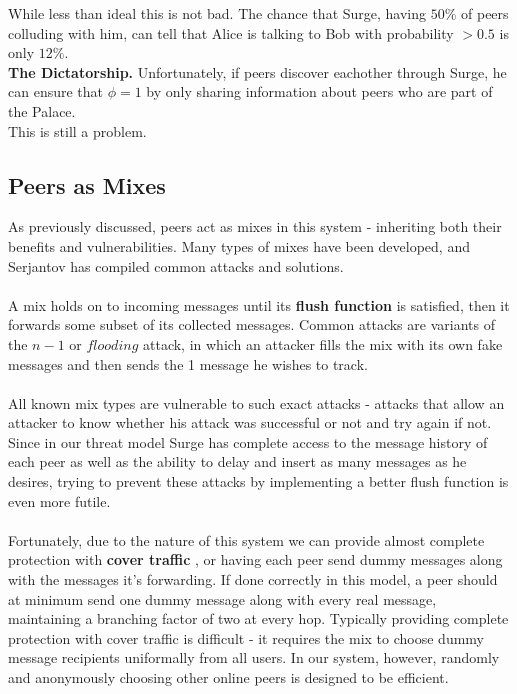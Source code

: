 \documentclass{paper}
\begin{document}
While less than ideal this is not bad. The chance that Surge, having $50\%$ of peers colluding with him, can tell that Alice is talking to Bob with probability $> 0.5$ is only $12\%$. 
\\
\textbf{The Dictatorship.}
Unfortunately, if peers discover eachother through Surge, he can ensure that $\phi = 1$ by only sharing information about peers who are part of the Palace. 
\\
This is still a problem.
\subsection{Peers as Mixes}
As previously discussed, peers act as mixes in this system - inheriting both their benefits and vulnerabilities. Many types of mixes have been developed, and Serjantov \cite{trickle02} has compiled common attacks and solutions. 
\paragraph{}A mix holds on to incoming messages until its \textbf{flush function} is satisfied, then it forwards some subset of its collected messages. Common attacks are variants of the $n - 1$ or $flooding$ attack, in which an attacker fills the mix with its own fake messages and then sends the 1 message he wishes to track. 
\paragraph{} All known mix types are vulnerable to such exact attacks \cite{trickle02} -  attacks that allow an attacker to know whether his attack was successful or not and try again if not. Since in our threat model Surge has complete access to the message history of each peer as well as the ability to delay and insert as many messages as he desires, trying to prevent these attacks by implementing a better flush function is even more futile. 
\paragraph{} Fortunately, due to the nature of this system we can provide almost complete protection with \textbf{cover traffic} \cite{trickle02}, or having each peer send dummy messages along with the messages it's forwarding. If done correctly in this model, a peer should at minimum send one dummy message along with every real message, maintaining a branching factor of two at every hop. Typically providing complete protection with cover traffic is difficult - it requires the mix to choose dummy message recipients uniformally from all users. In our system, however, randomly and anonymously choosing other online peers is designed to be efficient.
\end{document}

